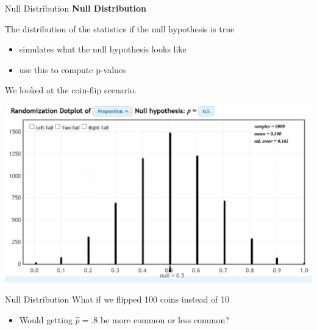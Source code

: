 \documentclass{beamer}
\begin{document}
\begin{frame}{Null Distribution}
\textbf{Null Distribution} 

The distribution of the statistics if the null hypothesis is true
\begin{itemize}
    \item simulates what the null hypothesis looks like
    \item use this to compute p-values
\end{itemize} \vspace{2mm}

We looked at the coin-flip scenario.

\begin{center}
    \includegraphics[scale=.42]{img/coin_null_distr.jpg}
\end{center}

\end{frame}

\begin{frame}{Null Distribution}
What if we flipped 100 coins instead of 10
\begin{itemize}
    \item Would getting $\hat{p} = .8$ be more common or less common?
\end{itemize}
\end{frame}
\end{document}
